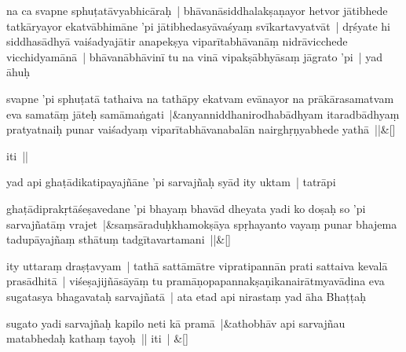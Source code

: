 \documentclass[article,12pt,a4paper]{memoir}%
\newcounter{parCount}
\begin{document}
	  
	  \pstart \leavevmode%
	\label{thakur75-5.30}na ca svapne sphuṭatāvyabhicāraḥ | bhāvanāsiddhalakṣaṇayor hetvor jātibhede tatkāryayor ekatvābhimāne 'pi jātibhedasyāvaśyaṃ svīkartavyatvāt | dṛśyate hi siddhasādhyā vaiśadyajātir anapekṣya viparītabhāvanāṃ nidrāvicchede vicchidyamānā | bhāvanābhāvinī tu na vinā vipakṣābhyāsaṃ jāgrato 'pi | yad āhuḥ 
	{}
	\pend%
      
	    
	    \stanza[\smallbreak]
	  svapne 'pi sphuṭatā tathaiva na tathāpy ekatvam evānayor na prākārasamatvam eva samatāṃ jāteḥ samāmaṅgati |&anyanniddhanirodhabādhyam itaradbādhyaṃ pratyatnaiḥ punar vaiśadyaṃ viparītabhāvanabalān nairghṛṇyabhede yathā ||\&[\smallbreak]
	  
	  
	  

	  
	  \pstart \leavevmode%
	iti ||
	{}
	\pend%
      

	  
	  \pstart \leavevmode%
	\label{thakur75-6.5}yad api ghaṭādikatipayajñāne 'pi sarvajñaḥ syād ity uktam | tatrāpi 
	{}
	\pend%
      
	    
	    \stanza[\smallbreak]
	  ghaṭādiprakṛtāśeṣavedane 'pi bhayaṃ bhavād dheyata yadi ko doṣaḥ so 'pi sarvajñatāṃ vrajet |&saṃsāraduḥkhamokṣāya spṛhayanto vayaṃ punar bhajema tadupāyajñaṃ sthātuṃ tadgītavartamani ||\&[\smallbreak]
	  
	  
	  

	  
	  \pstart \leavevmode%
	ity uttaraṃ draṣṭavyam | tathā sattāmātre vipratipannān prati sattaiva kevalā prasādhitā | viśeṣajijñāsāyāṃ tu pramāṇopapannakṣaṇikanairātmyavādina eva sugatasya bhagavataḥ sarvajñatā | ata etad api nirastaṃ yad āha Bhaṭṭaḥ 
	{}
	\pend%
      
	    
	    \stanza[\smallbreak]
	  \label{rna-ts-3149}sugato yadi sarvajñaḥ kapilo neti kā pramā |&athobhāv api sarvajñau matabhedaḥ kathaṃ tayoḥ || iti | \&[\smallbreak]
	  
	  
	  
\end{document}

